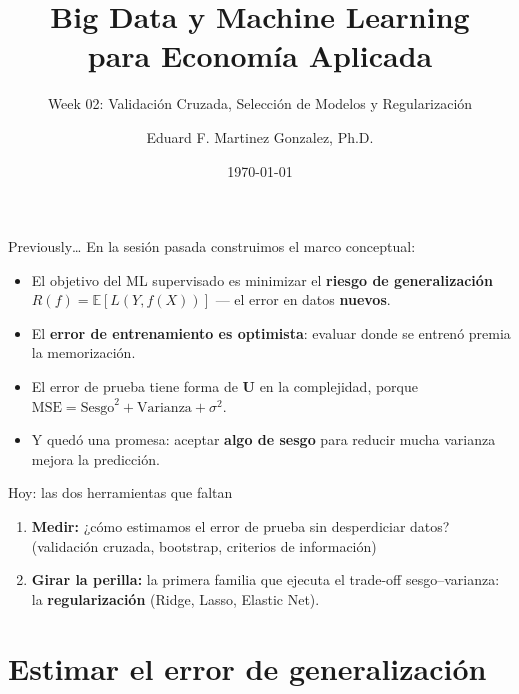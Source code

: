 \documentclass{beamer}
\title[BDML]{Big Data y Machine Learning \\ para Economía Aplicada}
\subtitle{Week 02: Validación Cruzada, Selección de Modelos y Regularización}
\author{Eduard F. Martinez Gonzalez, Ph.D.}
\institute[]{Departamento de Economía, Universidad Icesi}
\date{\today}
\newcommand{\E}{\mathbb{E}}
\newcommand{\1}{\mathbb{I}}
\newcommand{\MSE}{\mathrm{MSE}}
\begin{document}
\begin{frame}
\titlepage
\end{frame}

\begin{frame}{Previously\ldots}
\small
En la sesión pasada construimos el marco conceptual:
\begin{itemize}\itemsep5pt
  \item El objetivo del ML supervisado es minimizar el \textbf{riesgo de generalización} $R(f) = \E[L(Y, f(X))]$ --- el error en datos \textbf{nuevos}.
  \item El \textbf{error de entrenamiento es optimista}: evaluar donde se entrenó premia la memorización.
  \item El error de prueba tiene forma de \textbf{U} en la complejidad, porque $\MSE = \text{Sesgo}^2 + \text{Varianza} + \sigma^2$.
  \item Y quedó una promesa: aceptar \textbf{algo de sesgo} para reducir mucha varianza mejora la predicción.
\end{itemize}
\pause

\vspace{0.2cm}
\begin{block}{Hoy: las dos herramientas que faltan}
\begin{enumerate}
  \item \textbf{Medir:} ¿cómo estimamos el error de prueba sin desperdiciar datos? (validación cruzada, bootstrap, criterios de información)
  \item \textbf{Girar la perilla:} la primera familia que ejecuta el trade-off sesgo--varianza: la \textbf{regularización} (Ridge, Lasso, Elastic Net).
\end{enumerate}
\end{block}
\end{frame}


\section{Estimar el error de generalización}
\begin{frame}[noframenumbering]
\tableofcontents[currentsection]
\end{frame}
\end{document}
